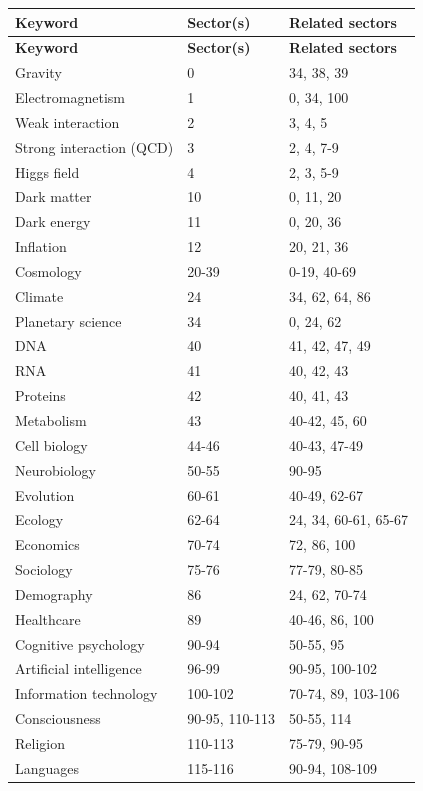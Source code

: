 \documentclass[13pt,a4paper]{article}
\begin{document}
	\begin{longtable}{|p{5cm}|p{3cm}|p{4cm}|}
		\hline
		\textbf{Keyword} & \textbf{Sector(s)} & \textbf{Related sectors} \\
		\hline
		\endfirsthead
		\hline
		\textbf{Keyword} & \textbf{Sector(s)} & \textbf{Related sectors} \\
		\hline
		\endhead
		
		Gravity & 0 & 34, 38, 39 \\
		Electromagnetism & 1 & 0, 34, 100 \\
		Weak interaction & 2 & 3, 4, 5 \\
		Strong interaction (QCD) & 3 & 2, 4, 7-9 \\
		Higgs field & 4 & 2, 3, 5-9 \\
		Dark matter & 10 & 0, 11, 20 \\
		Dark energy & 11 & 0, 20, 36 \\
		Inflation & 12 & 20, 21, 36 \\
		Cosmology & 20-39 & 0-19, 40-69 \\
		Climate & 24 & 34, 62, 64, 86 \\
		Planetary science & 34 & 0, 24, 62 \\
		DNA & 40 & 41, 42, 47, 49 \\
		RNA & 41 & 40, 42, 43 \\
		Proteins & 42 & 40, 41, 43 \\
		Metabolism & 43 & 40-42, 45, 60 \\
		Cell biology & 44-46 & 40-43, 47-49 \\
		Neurobiology & 50-55 & 90-95 \\
		Evolution & 60-61 & 40-49, 62-67 \\
		Ecology & 62-64 & 24, 34, 60-61, 65-67 \\
		Economics & 70-74 & 72, 86, 100 \\
		Sociology & 75-76 & 77-79, 80-85 \\
		Demography & 86 & 24, 62, 70-74 \\
		Healthcare & 89 & 40-46, 86, 100 \\
		Cognitive psychology & 90-94 & 50-55, 95 \\
		Artificial intelligence & 96-99 & 90-95, 100-102 \\
		Information technology & 100-102 & 70-74, 89, 103-106 \\
		Consciousness & 90-95, 110-113 & 50-55, 114 \\
		Religion & 110-113 & 75-79, 90-95 \\
		Languages & 115-116 & 90-94, 108-109 \\
		\hline
	\end{longtable}
	
\end{document}

